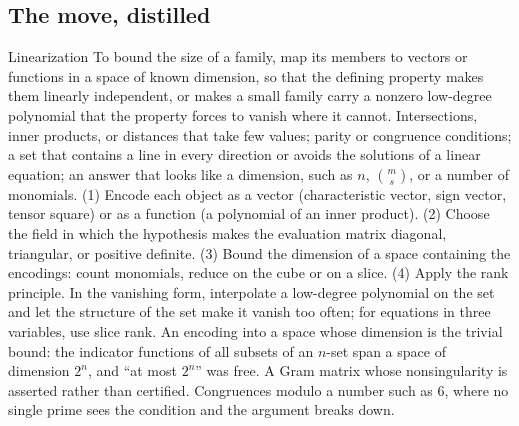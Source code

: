 \begin{refsection}[chapters/09-dimension.bib]
\section{The move, distilled}\label{sec:dimension:distilled}

\begin{move}{Linearization}
 To bound the size of a family, map its members to vectors or functions in a space of known dimension, so that the defining property makes them linearly independent, or makes a small family carry a nonzero low-degree polynomial that the property forces to vanish where it cannot.
 Intersections, inner products, or distances that take few values; parity or congruence conditions; a set that contains a line in every direction or avoids the solutions of a linear equation; an answer that looks like a dimension, such as $n$, $\binom ms$, or a number of monomials.
 (1) Encode each object as a vector (characteristic vector, sign vector, tensor square) or as a function (a polynomial of an inner product). (2) Choose the field in which the hypothesis makes the evaluation matrix diagonal, triangular, or positive definite. (3) Bound the dimension of a space containing the encodings: count monomials, reduce on the cube or on a slice. (4) Apply the rank principle. In the vanishing form, interpolate a low-degree polynomial on the set and let the structure of the set make it vanish too often; for equations in three variables, use slice rank.
 An encoding into a space whose dimension is the trivial bound: the indicator functions of all subsets of an $n$-set span a space of dimension $2^n$, and ``at most $2^n$'' was free. A Gram matrix whose nonsingularity is asserted rather than certified. Congruences modulo a number such as $6$, where no single prime sees the condition and the argument breaks down.
\end{move}



\end{refsection}
